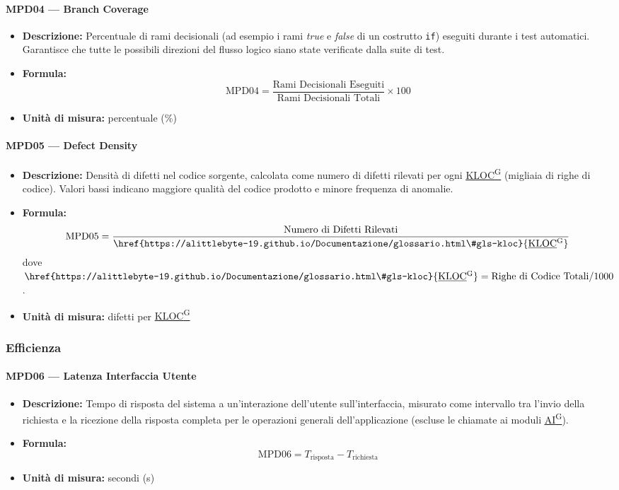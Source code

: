 \documentclass[a4paper,12pt]{article}
\providecommand{\glslink}[2]{\href{https://alittlebyte-19.github.io/Documentazione/glossario.html\#gls-#1}{\underline{#2}\textsuperscript{\scriptsize G}}}
\begin{document}
\paragraph{MPD04 --- Branch Coverage}
\begin{itemize}
    \item \textbf{Descrizione:} Percentuale di rami decisionali (ad esempio i rami \textit{true} e \textit{false} di un costrutto \texttt{if}) eseguiti durante i test automatici. Garantisce che tutte le possibili direzioni del flusso logico siano state verificate dalla suite di test.
    \item \textbf{Formula:}
    $$\text{MPD04} = \frac{\text{Rami Decisionali Eseguiti}}{\text{Rami Decisionali Totali}} \times 100$$
    \item \textbf{Unità di misura:} percentuale (\%)
\end{itemize}

\paragraph{MPD05 --- Defect Density}
\begin{itemize}
    \item \textbf{Descrizione:} Densità di difetti nel codice sorgente, calcolata come numero di difetti rilevati per ogni \glslink{kloc}{KLOC} (migliaia di righe di codice). Valori bassi indicano maggiore qualità del codice prodotto e minore frequenza di anomalie.
    \item \textbf{Formula:}
    $$\text{MPD05} = \frac{\text{Numero di Difetti Rilevati}}{\text{\glslink{kloc}{KLOC}}}$$
    dove $\text{\glslink{kloc}{KLOC}} = \text{Righe di Codice Totali} / 1000$.
    \item \textbf{Unità di misura:} difetti per \glslink{kloc}{KLOC}
\end{itemize}

\subsubsection{Efficienza}

\paragraph{MPD06 --- Latenza Interfaccia Utente}
\begin{itemize}
    \item \textbf{Descrizione:} Tempo di risposta del sistema a un'interazione dell'utente sull'interfaccia, misurato come intervallo tra l'invio della richiesta e la ricezione della risposta completa per le operazioni generali dell'applicazione (escluse le chiamate ai moduli \glslink{intelligenza-artificiale-ai}{AI}).
    \item \textbf{Formula:}
    $$\text{MPD06} = T_{\text{risposta}} - T_{\text{richiesta}}$$
    \item \textbf{Unità di misura:} secondi (s)
\end{itemize}
\end{document}
